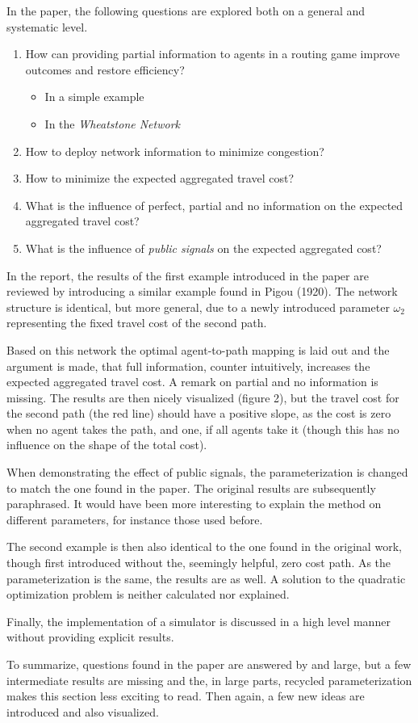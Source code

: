 \documentclass[../review.tex]{subfiles}
\begin{document}
In the paper, the following questions are explored both on a general and systematic level.
\begin{enumerate}
  \item How can providing partial information to agents in a routing game improve outcomes and restore efficiency?
  \begin{itemize}
    \item In a simple example
    \item In the \textit{Wheatstone Network}
  \end{itemize}
  \item How to deploy network information to minimize congestion?
  \item How to minimize the expected aggregated travel cost?
  \item What is the influence of perfect, partial and no information on the expected aggregated travel cost?
  \item What is the influence of \textit{public signals} on the expected aggregated cost?
\end{enumerate}
In the report, the results of the first example introduced in the paper are reviewed by introducing a similar example found in Pigou (1920). The network structure is identical, but more general, due to a newly introduced parameter $\omega_2$ representing the fixed travel cost of the second path.

Based on this network the optimal agent-to-path mapping is laid out and the argument is made, that full information, counter intuitively, increases the expected aggregated travel cost. A remark on partial and no information is missing. The results are then nicely visualized (figure 2), but the travel cost for the second path (the red line) should have a positive slope, as the cost is zero when no agent takes the path, and one, if all agents take it (though this has no influence on the shape of the total cost).

When demonstrating the effect of public signals, the parameterization is changed to match the one found in the paper. The original results are subsequently paraphrased. It would have been more interesting to explain the method on different parameters, for instance those used before.

The second example is then also identical to the one found in the original work, though first introduced without the, seemingly helpful, zero cost path. As the parameterization is the same, the results are as well. A solution to the quadratic optimization problem is neither calculated nor explained.

Finally, the implementation of a simulator is discussed in a high level manner without providing explicit results.

To summarize, questions found in the paper are answered by and large, but a few intermediate results are missing and the, in large parts, recycled parameterization makes this section less exciting to read. Then again, a few new ideas are introduced and also visualized.
\end{document}
